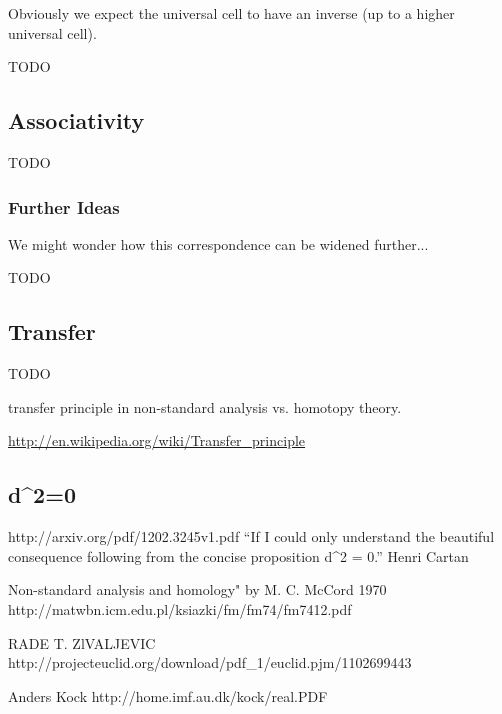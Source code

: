 \documentclass{article}
\begin{document}
Obviously we expect the universal cell to have an inverse (up to a higher universal cell).

TODO

\subsection{Associativity}

TODO

\subsubsection{Further Ideas}

We might wonder how this correspondence can be widened further...

TODO

\subsection{Transfer}

TODO

transfer principle in non-standard analysis vs. homotopy theory.

\url{http://en.wikipedia.org/wiki/Transfer_principle}

\subsection{d^2=0}
http://arxiv.org/pdf/1202.3245v1.pdf
“If I could only understand the beautiful consequence following from the concise proposition d^2 = 0.” Henri Cartan

Non-standard analysis and homology" by M. C. McCord 1970
http://matwbn.icm.edu.pl/ksiazki/fm/fm74/fm7412.pdf

RADE T. ZlVALJEVIC
http://projecteuclid.org/download/pdf_1/euclid.pjm/1102699443

Anders Kock
http://home.imf.au.dk/kock/real.PDF
\end{document}
